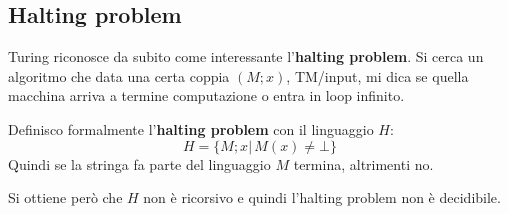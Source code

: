 \documentclass[a4paper,12pt, oneside]{book}
\begin{document}
\subsection{Halting problem}
Turing riconosce da subito come interessante l'\textbf{halting problem}. Si
cerca un algoritmo che data una certa coppia $(M;x)$, TM/input, mi dica se
quella macchina arriva a termine computazione o entra in loop infinito.
\begin{definizione}
  Definisco formalmente l'\textbf{halting problem} con il linguaggio $H$:
  \[H=\{M;x|\,M(x)\neq\bot\}\]
  Quindi se la stringa fa parte del linguaggio $M$ termina, altrimenti no.
\end{definizione}
\begin{teorema}
  Si ottiene però che $H$ non è ricorsivo e quindi l'halting problem non è
  decidibile.
\end{teorema}
\end{document}
